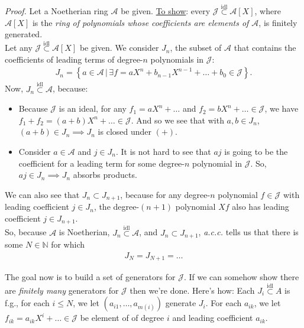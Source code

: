 \documentclass[12pt]{article}
\newcommand{\lc}{\left\{}
\newcommand{\rc}{\right\}}
\begin{document}
\noindent \textit{Proof.} 
	Let a Noetherian ring $\mathcal{A}$ be given. \underline{To show}: every $\mathcal{J} \overset{\text{idl}}{\subset}\mathcal{A}[X]$, where $\mathcal{A}[X]$ is the \textit{ring of polynomials whose coefficients are elements of $\mathcal{A}$}, is finitely generated.\\
	
	\noindent Let any $\mathcal{J} \overset{\text{idl}}{\subset} \mathcal{A}[X]$ be given. We consider $J_n$, the subset of $\mathcal{A}$ that contains the coefficients of leading terms of degree-$n$ polynomials in $\mathcal{J}$:
	\begin{align*}
	J_n = \lc a \in \mathcal{A}\, \vert\, \exists f = aX^n + b_{n-1}X^{n-1} + \dots + b_0 \in \mathcal{J} \rc.
	\end{align*} 
	\noindent Now, $J_n \overset{\text{idl}}{\subset}\mathcal{A}$, because:
	\begin{itemize}
		\item Because $\mathcal{J}$ is an ideal, for any $f_1 = aX^{n} + \dots$ and  $f_2 = bX^{n} + \dots \in \mathcal{J}$, we have $f_1 + f_2 = (a+b)X^{n}+ \dots \in \mathcal{J}$. And so we see that with $a,b\in J_n$, $(a+b)\in J_n \implies J_n$ is closed under $(+)$.
		\item Consider $a\in \mathcal{A}$ and $j \in J_n$. It is not hard to see that $aj$ is going to be the coefficient for a leading term for some degree-$n$ polynomial in $\mathcal{J}$. So, $aj \in J_n \implies J_n$ absorbs products.  
	\end{itemize}

	\noindent We can also see that $J_n \subset J_{n+1}$, because for any degree-$n$ polynomial $f \in \mathcal{J}$ with leading coefficient $j \in J_n$, the degree-$(n+1)$ polynomial $Xf$ also has leading coefficient $j \in J_{n+1}$. \\
	
	\noindent So, because $\mathcal{A}$ is Noetherian, $J_n \overset{\text{idl}}{\subset} \mathcal{A}$, and $J_n \subset J_{n+1}$, \textit{a.c.c.} tells us that there is some $N \in \mathbb{N}$ for which
	\begin{align*}
	J_N = J_{N+1} = \dots
	\end{align*} 
	
	\noindent The goal now is to build a set of generators for $\mathcal{J}$. If we can somehow show there are \textit{finitely many} generators for $\mathcal{J}$ then we're done. Here's how: Each $J_i \overset{\text{idl}}{\subset} A$ is f.g., for each $i\leq N$, we let $(a_{i1}, \dots, a_{m(i)})$ generate $J_i$. For each $a_{ik}$, we let $f_{ik} = a_{ik}X^i + \dots \in \mathcal{J}$ be element of of degree $i$ and leading coefficient $a_{ik}$. \\
	
\end{document}
